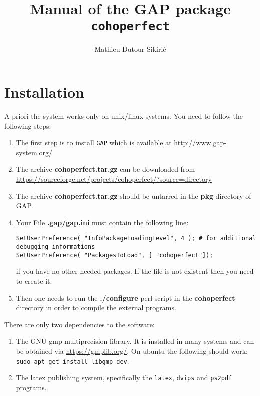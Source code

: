 \documentclass[12pt]{amsart}
\begin{document}
\author{Mathieu Dutour Sikiri\'c}
\address{Mathieu Dutour Sikiri\'c, Rudjer Boskovi\'c Institute, Bijenicka 54, 10000 Zagreb, Croatia}


\title{Manual of the GAP package {\tt cohoperfect}}
\date{}

\maketitle
\tableofcontents

\section{Installation}

A priori the system works only on unix/linux systems.
You need to follow the following steps:
\begin{enumerate}
\item The first step is to install {\tt GAP} which is available at \url{http://www.gap-system.org/}

\item The archive {\bf cohoperfect.tar.gz} can be downloaded from
  {\url{https://sourceforge.net/projects/cohoperfect/?source=directory}}

\item The archive {\bf cohoperfect.tar.gz} should be untarred in the {\bf pkg} directory of GAP.

\item Your File {\bf .gap/gap.ini} must contain the following line:
\begin{verbatim}
SetUserPreference( "InfoPackageLoadingLevel", 4 ); # for additional debugging informations
SetUserPreference( "PackagesToLoad", [ "cohoperfect"]);
\end{verbatim}
if you have no other needed packages. If the file is not existent then you need to create it.

\item Then one needs to run the {\bf ./configure} perl script in the {\bf cohoperfect} directory in order to compile the external programs.
\end{enumerate}
There are only two dependencies to the software:
\begin{enumerate}
\item The GNU gmp multiprecision library. It is installed in many systems and can be obtained via \url{https://gmplib.org/}. On ubuntu the following should work: {\tt sudo apt-get install libgmp-dev}.
\item The latex publishing system, specifically the {\tt latex}, {\tt dvips} and {\tt ps2pdf} programs.  
\end{enumerate}
\end{document}
